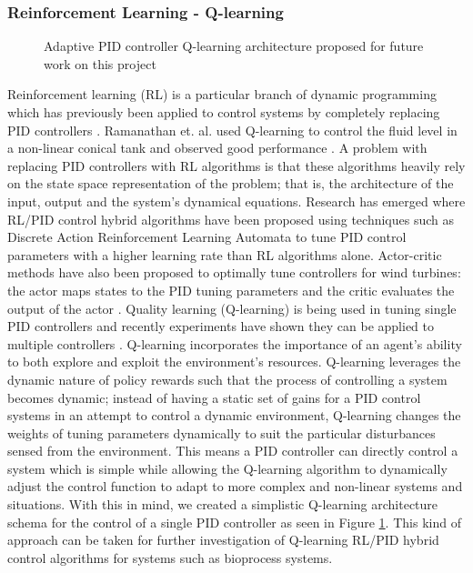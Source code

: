 \documentclass[conference]{IEEEtran}
\theoremstyle{definition}
\begin{document}
\subsubsection{Reinforcement Learning - Q-learning}
\begin{figure}
    \caption{Adaptive PID controller Q-learning architecture proposed for future work on this project}
    \label{q-learning}
\end{figure}
Reinforcement learning (RL) is a particular branch of dynamic programming which has previously been applied to control systems by completely replacing PID controllers \cite{ref6}. Ramanathan et. al. used Q-learning to control the fluid level in a non-linear conical tank and observed good performance \cite{ref7}. A problem with replacing PID controllers with RL algorithms is that these algorithms heavily rely on the state space representation of the problem; that is, the architecture of the input, output and the system's dynamical equations. 
Research has emerged where RL/PID control hybrid algorithms have been proposed using techniques such as Discrete Action Reinforcement Learning Automata \cite{ref13} to tune PID control parameters with a higher learning rate than RL algorithms alone. Actor-critic methods have also been proposed to optimally tune controllers \cite{ref18} for wind turbines: the actor maps states to the PID tuning parameters and the critic evaluates the output of the actor \cite{the_paper, ref14}. Quality learning (Q-learning) is being used in tuning single PID controllers \cite{ref19} and recently experiments have shown they can be applied to multiple controllers \cite{the_paper}. Q-learning incorporates the importance of an agent's ability to both explore and exploit the environment's resources. Q-learning leverages the dynamic nature of policy rewards such that the process of controlling a system becomes dynamic; instead of having a static set of gains for a PID control systems in an attempt to control a dynamic environment, Q-learning changes the weights of tuning parameters dynamically to suit the particular disturbances sensed from the environment. This means a PID controller can directly control a system which is simple while allowing the Q-learning algorithm to dynamically adjust the control function to adapt to more complex and non-linear systems and situations. With this in mind, we created a simplistic Q-learning architecture schema for the control of a single PID controller as seen in Figure \ref{q-learning}. This kind of approach can be taken for further investigation of Q-learning RL/PID hybrid control algorithms for systems such as bioprocess systems.
\end{document}
